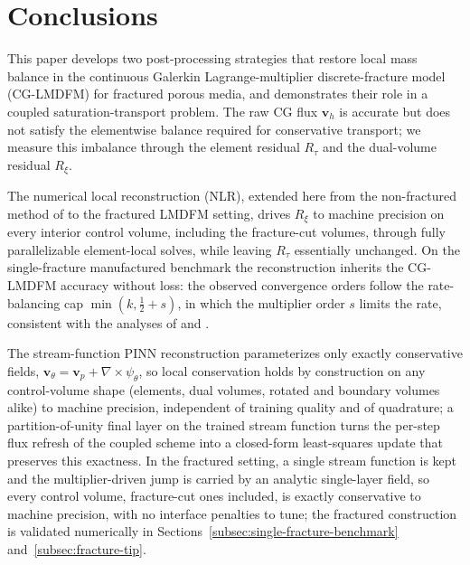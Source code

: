\documentclass[a4paper,fleqn]{cas-sc}
\newcommand{\vflux}{\mathbf{v}}
\newcommand{\curl}{\nabla\times}          %
\newcommand{\vp}{\vflux_{p}}              %
\begin{document}
\section{Conclusions}
\label{sec:conclusions}

This paper develops two post-processing strategies that restore local mass
balance in the continuous Galerkin Lagrange-multiplier discrete-fracture model
(CG-LMDFM) for fractured porous media, and demonstrates their role in a coupled
saturation-transport problem. The raw CG flux \(\vflux_h\) is accurate but does
not satisfy the elementwise balance required for conservative transport; we
measure this imbalance through the element residual \(R_\tau\) and the
dual-volume residual \(R_\xi\).

The numerical local reconstruction (NLR), extended here from the non-fractured
method of \citet{DENG2019166} to the fractured LMDFM setting, drives \(R_\xi\) to
machine precision on every interior control volume, including the fracture-cut
volumes, through fully parallelizable element-local solves, while leaving
\(R_\tau\) essentially unchanged. On the single-fracture manufactured benchmark
the reconstruction inherits the CG-LMDFM accuracy without loss: the observed
convergence orders follow the rate-balancing cap \(\min(k,\tfrac12+s)\), in which
the multiplier order \(s\) limits the rate, consistent with the analyses of
\citet{DENG2019166} and \citet{Koeppel2019}.

The stream-function PINN reconstruction parameterizes only exactly conservative
fields, \(\vflux_\theta=\vp+\curl\psi_\theta\), so local conservation holds by
construction on any control-volume shape (elements, dual volumes, rotated and
boundary volumes alike) to machine precision, independent of training quality
and of quadrature; a partition-of-unity final layer on the trained stream
function turns the per-step flux refresh of the coupled scheme into a
closed-form least-squares update that preserves this exactness. In the
fractured setting, a single stream function is kept and the multiplier-driven
jump is carried by an analytic single-layer field, so every control volume,
fracture-cut ones included, is exactly conservative to machine precision, with no
interface penalties to tune; the fractured construction is validated numerically
in Sections~\ref{subsec:single-fracture-benchmark} and~\ref{subsec:fracture-tip}.
\end{document}
